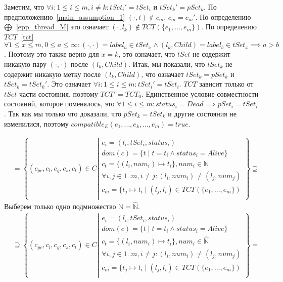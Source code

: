 Заметим, что $\forall i: 1 \le i \le m, i \neq k: tSet_i' = tSet_i$ и $tSet_k' = pSet_k$.
По предположению~\ref{main_assumption_1} $(\cdot, t) \notin c_m$, $c_m = c_m'$.
По определению $\mathrel{\bigoplus}$~\ref{epp_thread_M} это означает $(\cdot, l_k) \notin TCT(\{e_1, \dots, e_m\})$.
По определению $TCT$~\ref{tct} $\forall 1 \le x \le m, 0 \le a \le \infty: (\cdot, \cdot) = label_a \in tSet_x \land (l_k, Child) = label_b \in tSet_x \implies a > b$.
Поэтому это также верно для $x = k$, это означает, что $tSet$ не содержит никакую пару $(\cdot, \cdot)$ после $(l_k, Child)$.
Итак, мы показали, что $tSet_k$ не содержит никакую метку после $(l_k, Child)$, что означает
$tSet_k = pSet_k$ и $tSet_k = tSet_k'$. 
Это означает $\forall i: 1 \le i \le m: tSet_i' = tSet_i$.
$TCT$ зависит только от $tSet$ части состояния, поэтому $TCT' = TCT_0$.
Единственное условие совместности состояний, которое поменялось, это $\forall 1 \le i \le m: status_i = Dead \implies pSet_i = tSet_i$.
Так как мы только что доказали, что $pSet_k = tSet_k$ и другие состояния не изменилися, поэтому $compatible_E(e_1, \dots, e_k, \dots, e_m) = true$.

\begin{align}
& = \left\lbrace (c_{pc},c_l,c_g,c_s, c_t) \in C 
\left| 
\begin{array}{c}
e_i = (l_i, tSet_i, status_i) \\
dom(c) = \{t \mid t = t_i \land status_i = Alive\}\\
c_t = \{(l_i, num_i) \mapsto t_i\}, num_i \in \mathbb{N} \\
\forall i, j \in \overline{1..m}, i \neq j: (l_i, num_i) \neq (l_j, num_j)\\
c_m = \{ t_j \mapsto t_i \mid (l_j, l_i) \in TCT(\{e_1, \dots, e_m\}) \\
\end{array}
\right.
\right\rbrace \supseteq \nonumber
\end{align}
Выберем только одно подмножество $\mathbb{N} = \widehat{\mathbb{N}}$.
\begin{align}
& \supseteq \left\lbrace (c_{pc},c_l,c_g,c_s, c_t) \in C 
\left| 
\begin{array}{c}
e_i = (l_i, tSet_i, status_i) \\
dom(c) = \{t \mid t = t_i \land status_i = Alive\}\\
c_t = \{(l_i, num_i) \mapsto t_i\}, num_i \in \widehat{\mathbb{N}} \\
\forall i, j \in \overline{1..m}, i \neq j: (l_i, num_i) \neq (l_j, num_j)\\
c_m = \{ t_j \mapsto t_i \mid (l_j, l_i) \in TCT(\{e_1, \dots, e_m\}) \\
\end{array}
\right.
\right\rbrace = \nonumber
\end{align}

